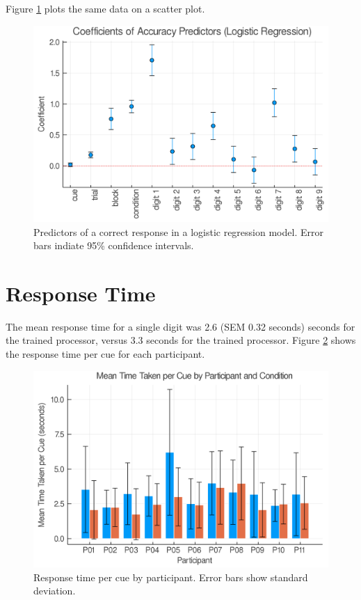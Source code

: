 \documentclass[a4paper,11pt,openany]{book}
\begin{document}
Figure \ref{fig:org02653fe} plots the same data on a scatter plot.

\begin{figure}[htbp]
\centering
\includegraphics[width=.9\linewidth]{./images/statistical_effects.png}
\caption{\label{fig:org02653fe}
Predictors of a correct response in a logistic regression model. Error bars indiate 95\% confidence intervals.}
\end{figure}

\section*{Response Time}
\label{sec:orgde154c9}

The mean response time for a single digit was 2.6 (SEM 0.32 seconds) seconds for the trained processor, versus 3.3 seconds for the trained processor.
Figure \ref{fig:orgfb5ca63} shows the response time per cue for each participant.

\begin{figure}[htbp]
\centering
\includegraphics[width=.9\linewidth]{./images/response_time_by_participant.png}
\caption{\label{fig:orgfb5ca63}
Response time per cue by participant. Error bars show standard deviation.}
\end{figure}
\end{document}
